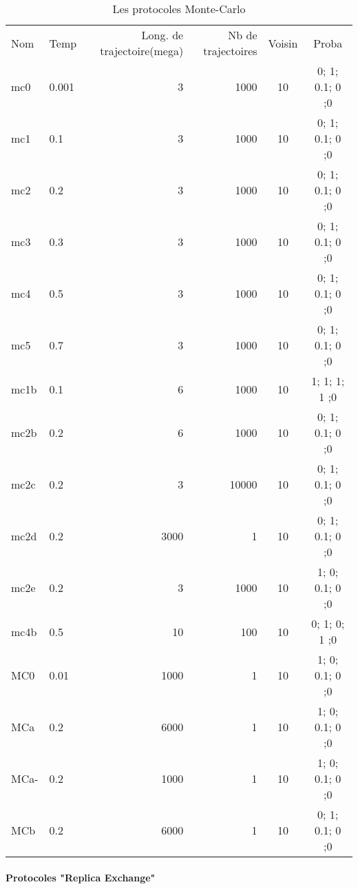     \begin{table}[!htbp]
      \centering

      \begin{tabular}{llrrcc}

        \toprule
        Nom & Temp & Long. de trajectoire(mega) & Nb de trajectoires  & Voisin & Proba \\
        \cmidrule{1-6}
        mc0   & 0.001 &  3  &  1000  & 10 & 0; 1; 0.1; 0 ;0 \\      
        mc1   & 0.1   &  3  &  1000  & 10 & 0; 1; 0.1; 0 ;0 \\  
        mc2   & 0.2   &  3  &  1000  & 10 & 0; 1; 0.1; 0 ;0 \\ 
        mc3   & 0.3   &  3  &  1000  & 10 & 0; 1; 0.1; 0 ;0 \\               
        mc4   & 0.5   &  3  &  1000  & 10 & 0; 1; 0.1; 0 ;0 \\  
        mc5   & 0.7   &  3  &  1000  & 10 & 0; 1; 0.1; 0 ;0 \\  
        mc1b  & 0.1   &  6  &  1000  & 10 & 1; 1;   1; 1 ;0 \\  
        mc2b  & 0.2   &  6  &  1000  & 10 & 0; 1; 0.1; 0 ;0 \\      
        mc2c  & 0.2   &  3  & 10000  & 10 & 0; 1; 0.1; 0 ;0 \\   
        mc2d  & 0.2   &  3000  &  1 & 10  & 0; 1; 0.1; 0 ;0 \\ 
        mc2e  & 0.2   &  3  &  1000  & 10 & 1; 0; 0.1; 0 ;0 \\     
        mc4b  & 0.5   & 10  &   100  & 10 & 0; 1;   0; 1 ;0 \\
        \cmidrule{1-6}
        MC0   & 0.01  &  1000  &  1  & 10 & 1; 0; 0.1; 0 ;0 \\            
        MCa   & 0.2   &  6000  &  1  & 10 & 1; 0; 0.1; 0 ;0 \\   
        MCa-  & 0.2   &  1000  &  1  & 10 & 1; 0; 0.1; 0 ;0 \\   
        MCb   & 0.2   &  6000  &  1  & 10 & 0; 1; 0.1; 0 ;0 \\      

        \bottomrule   
        
      \end{tabular}      
      \caption{Les protocoles Monte-Carlo}
\label{tab:protoMC}      
    \end{table}

   \paragraph{Protocoles "Replica Exchange"} 

